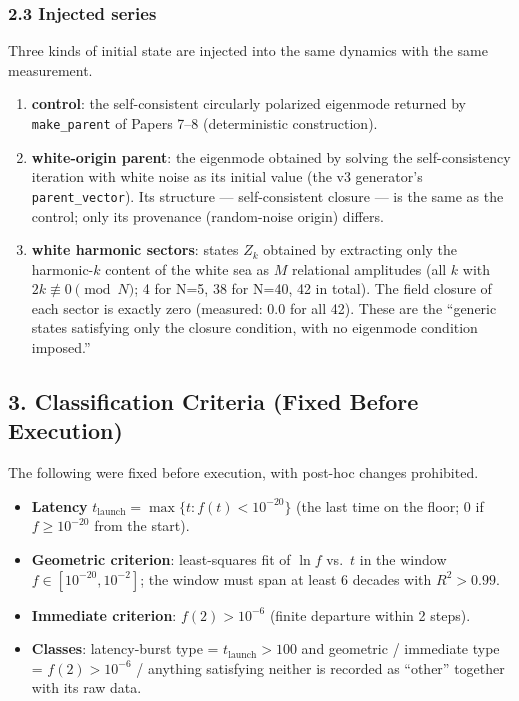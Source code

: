 \documentclass[
  a4paper,
]{article}
\providecommand{\tightlist}{%
  \setlength{\itemsep}{0pt}\setlength{\parskip}{0pt}}
\begin{document}
\subsubsection{2.3 Injected series}\label{injected-series}

Three kinds of initial state are injected into the same dynamics with
the same measurement.

\begin{enumerate}
\def\labelenumi{\arabic{enumi}.}
\tightlist
\item
  \textbf{control}: the self-consistent circularly polarized eigenmode
  returned by \texttt{make\_parent} of Papers 7--8 (deterministic
  construction).
\item
  \textbf{white-origin parent}: the eigenmode obtained by solving the
  self-consistency iteration with white noise as its initial value (the
  v3 generator's \texttt{parent\_vector}). Its structure ---
  self-consistent closure --- is the same as the control; only its
  provenance (random-noise origin) differs.
\item
  \textbf{white harmonic sectors}: states \(Z_k\) obtained by extracting
  only the harmonic-\(k\) content of the white sea as \(M\) relational
  amplitudes (all \(k\) with \(2k\not\equiv0\pmod N\); 4 for N=5, 38 for
  N=40, 42 in total). The field closure of each sector is exactly zero
  (measured: 0.0 for all 42). These are the ``generic states satisfying
  only the closure condition, with no eigenmode condition imposed.''
\end{enumerate}

\subsection{3. Classification Criteria (Fixed Before
Execution)}\label{classification-criteria-fixed-before-execution}

The following were fixed before execution, with post-hoc changes
prohibited.

\begin{itemize}
\tightlist
\item
  \textbf{Latency} \(t_{\mathrm{launch}}=\max\{t: f(t)<10^{-20}\}\) (the
  last time on the floor; 0 if \(f\ge10^{-20}\) from the start).
\item
  \textbf{Geometric criterion}: least-squares fit of \(\ln f\) vs.~\(t\)
  in the window \(f\in[10^{-20},10^{-2}]\); the window must span at
  least 6 decades with \(R^2>0.99\).
\item
  \textbf{Immediate criterion}: \(f(2)>10^{-6}\) (finite departure
  within 2 steps).
\item
  \textbf{Classes}: latency-burst type = \(t_{\mathrm{launch}}>100\) and
  geometric / immediate type = \(f(2)>10^{-6}\) / anything satisfying
  neither is recorded as ``other'' together with its raw data.
\end{itemize}
\end{document}
